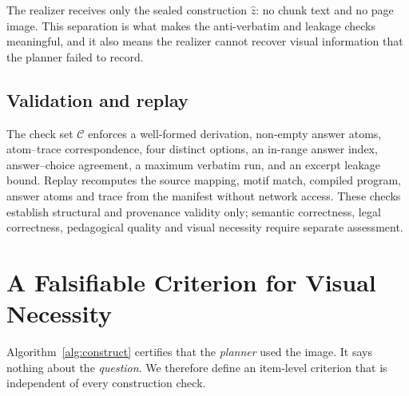 \documentclass[conference]{IEEEtran}
\begin{document}
The realizer receives only the sealed construction $\hat{z}$: no chunk text and no
page image. This separation is what makes the anti-verbatim and leakage checks
meaningful, and it also means the realizer cannot recover visual information that
the planner failed to record.

\subsection{Validation and replay}
The check set $\mathcal{C}$ enforces a well-formed derivation, non-empty answer
atoms, atom--trace correspondence, four distinct options, an in-range answer index,
answer--choice agreement, a maximum verbatim run, and an excerpt leakage bound.
Replay recomputes the source mapping, motif match, compiled program, answer atoms
and trace from the manifest without network access. These checks establish
structural and provenance validity only; semantic correctness, legal correctness,
pedagogical quality and visual necessity require separate assessment.

\section{A Falsifiable Criterion for Visual Necessity}
\label{sec:vd}
Algorithm~\ref{alg:construct} certifies that the \emph{planner} used the image. It
says nothing about the \emph{question}. We therefore define an item-level criterion
that is independent of every construction check.
\end{document}
